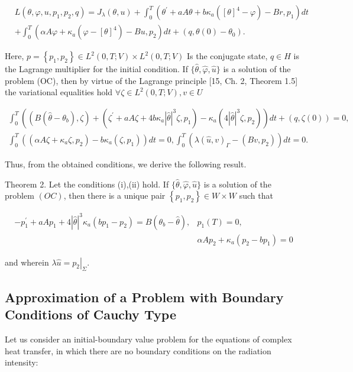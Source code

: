 $$
\begin{aligned}
& L\left(\theta, \varphi, u, p_{1}, p_{2}, q\right)=J_{\lambda}(\theta, u)+\int_{0}^{T}\left(\theta^{\prime}+a A \theta+b \kappa_{a}\left([\theta]^{4}-\varphi\right)-B r, p_{1}\right) d t \\
&+\int_{0}^{T}\left(\alpha A \varphi+\kappa_{a}\left(\varphi-[\theta]^{4}\right)-B u, p_{2}\right) d t+\left(q, \theta(0)-\theta_{0}\right) .
\end{aligned}
$$

Here, $p=\left\{p_{1}, p_{2}\right\} \in L^{2}(0, T ; V) \times L^{2}(0, T ; V)$ Is the conjugate state, $q \in H$ is the Lagrange multiplier for the initial condition. If $\{\widehat{\theta}, \widehat{\varphi}, \widehat{u}\}$ is a solution of the problem (OC), then by virtue of the Lagrange principle [15, Ch. 2, Theorem 1.5] the variational equalities hold $\forall \zeta \in L^{2}(0, T ; V), v \in U$

$$
\begin{gathered}
\int_{0}^{T}\left(\left(B\left(\widehat{\theta}-\theta_{b}\right), \zeta\right)+\left(\zeta^{\prime}+a A \zeta+4 b \kappa_{a}|\widehat{\theta}|^{3} \zeta, p_{1}\right)-\kappa_{a}\left(4|\widehat{\theta}|^{3} \zeta, p_{2}\right)\right) d t+(q, \zeta(0))=0, \\
\int_{0}^{T}\left(\left(\alpha A \zeta+\kappa_{a} \zeta, p_{2}\right)-b \kappa_{a}\left(\zeta, p_{1}\right)\right) d t=0, \int_{0}^{T}\left(\lambda(\widehat{u}, v)_{\Gamma}-\left(B v, p_{2}\right)\right) d t=0 .
\end{gathered}
$$

Thus, from the obtained conditions, we derive the following result.

Theorem 2. Let the conditions (i),(ii) hold. If $\{\widehat{\theta}, \widehat{\varphi}, \widehat{u}\}$ is a solution of the problem $(O C)$, then there is a unique pair $\left\{p_{1}, p_{2}\right\} \in W \times W$ such that

$$
\begin{aligned}
-p_{1}^{\prime}+a A p_{1}+4|\widehat{\theta}|^{3} \kappa_{a}\left(b p_{1}-p_{2}\right)=B\left(\theta_{b}-\widehat{\theta}\right), & p_{1}(T)=0, \\
& \alpha A p_{2}+\kappa_{a}\left(p_{2}-b p_{1}\right)=0
\end{aligned}
$$

and wherein $\lambda \widehat{u}=\left.p_{2}\right|_{\Sigma}$.

\subsection{Approximation of a Problem with Boundary Conditions of Cauchy Type}
Let us consider an initial-boundary value problem for the equations of complex heat transfer, in which there are no boundary conditions on the radiation intensity:

